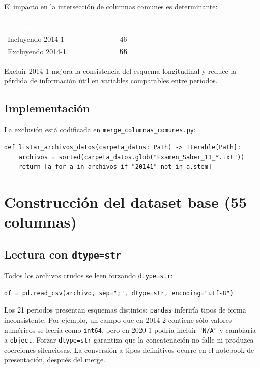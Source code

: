 \documentclass[12pt, a4paper]{article}
\newcommand{\thead}[1]{\cellcolor{tabheader}\textcolor{white}{\textbf{#1}}}
\begin{document}
El impacto en la intersección de columnas comunes es determinante:

\vspace{4pt}
\begin{tabular}{lcc}
  \toprule
  \thead{Escenario} & \thead{Columnas en la intersección} \\
  \midrule
  \rowcolor{rowalt}
  Incluyendo 2014-1 & 46 \\
  Excluyendo 2014-1 & \textbf{55} \\
  \bottomrule
\end{tabular}
\vspace{6pt}

Excluir 2014-1 mejora la consistencia del esquema longitudinal y reduce la pérdida
de información útil en variables comparables entre periodos.

\subsection{Implementación}

La exclusión está codificada en \texttt{merge\_columnas\_comunes.py}:

\begin{lstlisting}
def listar_archivos_datos(carpeta_datos: Path) -> Iterable[Path]:
    archivos = sorted(carpeta_datos.glob("Examen_Saber_11_*.txt"))
    return [a for a in archivos if "20141" not in a.stem]
\end{lstlisting}

\section{Construcción del dataset base (55 columnas)}

\subsection{Lectura con \texttt{dtype=str}}

Todos los archivos crudos se leen forzando \texttt{dtype=str}:

\begin{lstlisting}
df = pd.read_csv(archivo, sep=";", dtype=str, encoding="utf-8")
\end{lstlisting}

Los 21 periodos presentan esquemas distintos; \texttt{pandas} inferiría tipos de
forma inconsistente. Por ejemplo, un campo que en 2014-2 contiene sólo valores
numéricos se leería como \texttt{int64}, pero en 2020-1 podría incluir \texttt{"N/A"}
y cambiaría a \texttt{object}. Forzar \texttt{dtype=str} garantiza que la
concatenación no falle ni produzca coerciones silenciosas. La conversión a tipos
definitivos ocurre en el notebook de presentación, después del merge.
\end{document}
